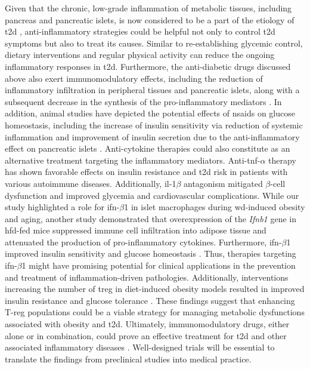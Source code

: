 \par Given that the chronic, low-grade inflammation of metabolic tissues, including pancreas and pancreatic islets, is now considered to be a part of the etiology of \gls{t2d} \textbf{\cite{cuenco_islet_2022}}, anti-inflammatory strategies could be helpful not only to control \gls{t2d} symptoms but also to treat its causes. Similar to re-establishing glycemic control, dietary interventions and regular physical activity can reduce the ongoing inflammatory responses in \gls{t2d}. Furthermore, the anti-diabetic drugs discussed above also exert immunomodulatory effects, including the reduction of inflammatory infiltration in peripheral tissues and pancreatic islets, along with a subsequent decrease in the synthesis of the pro-inflammatory mediators \textbf{\cite{kurylowicz_anti-inflammatory_2020}}. In addition, animal studies have depicted the potential effects of \glspl{nsaid} on glucose homeostasis, including the increase of insulin sensitivity via reduction of systemic inflammation and improvement of insulin secretion due to the anti-inflammatory effect on pancreatic islets \textbf{\cite{kurylowicz_anti-inflammatory_2020}}. Anti-cytokine therapies could also constitute as an alternative treatment targeting the inflammatory mediators. Anti-\gls{tnf}-$\alpha$ therapy has shown favorable effects on insulin resistance and \gls{t2d} risk in patients with various autoimmune diseases. Additionally, \gls{il}-1$\beta$ antagonism mitigated $\beta$-cell dysfunction and improved glycemia and cardiovascular complications. While our study highlighted a role for \gls{ifn}-$\beta$1 in islet macrophages during \gls{wd}-induced obesity and aging, another study demonstrated that overexpression of the \textit{Ifnb1} gene in \gls{hfd}-fed mice suppressed immune cell infiltration into adipose tissue and attenuated the production of pro-inflammatory cytokines. Furthermore, \gls{ifn}-$\beta$1 improved insulin sensitivity and glucose homeostasis \textbf{\cite{alsaggar_interferon_2017}}. Thus, therapies targeting \gls{ifn}-$\beta$1 might have promising potential for clinical applications in the prevention and treatment of inflammation-driven pathologies. Additionally, interventions increasing the number of \gls{treg} in diet-induced obesity models resulted in improved insulin resistance and glucose tolerance \textbf{\cite{winer_normalization_2009,feuerer_lean_2009}}. These findings suggest that enhancing T-reg populations could be a viable strategy for managing metabolic dysfunctions associated with obesity and \gls{t2d}. Ultimately, immunomodulatory drugs, either alone or in combination, could prove an effective treatment for \gls{t2d} and other associated inflammatory diseases \textbf{\cite{rohm_inflammation_2022}}. Well-designed trials will be essential to translate the findings from preclinical studies into medical practice.\\

